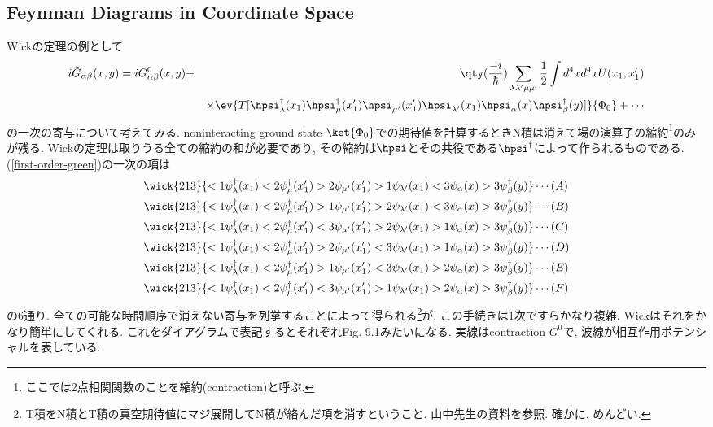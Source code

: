 \documentclass[10.5pt,a4paper]{jreport}
\begin{document}
\subsection{Feynman Diagrams in Coordinate Space}
Wickの定理の例として
\begin{eqnarray}
  \nonumber  i\tilde{G}_{\alpha\beta}(x, y) = iG^0_{\alpha\beta}(x, y) &+& \qty(\frac{-i}{\hbar})\sum_{\lambda\lambda'\mu\mu'}\frac{1}{2}\int d^4xd^4x U(x_1, x_1')\\
  &&\times \ev{T[\hpsi_{\lambda}^\dagger(x_1)\hpsi^\dagger_{\mu}(x_1')\hpsi_{\mu'}(x_1')\hpsi_{\lambda'}(x_1)\hpsi_{\alpha}(x)\hpsi^\dagger_{\beta}(y)]}{\Phi_0} + \cdots\label{first-order-green}
\end{eqnarray}
の一次の寄与について考えてみる. noninteracting ground state $\ket{\Phi_0}$での期待値を計算するときN積は消えて場の演算子の縮約\footnote{ここでは2点相関関数のことを縮約(contraction)と呼ぶ. }のみが残る. Wickの定理は取りうる全ての縮約の和が必要であり, その縮約は$\hpsi$とその共役である$\hpsi^\dagger$によって作られるものである. (\ref{first-order-green})の一次の項は
\begin{eqnarray}
  \wick{213}{<1\psi_{\lambda}^\dagger(x_1) <2\psi^\dagger_{\mu}(x_1') >2\psi_{\mu'}(x_1') >1\psi_{\lambda'}(x_1) <3\psi_{\alpha}(x) >3\psi^\dagger_{\beta}(y)} & \cdots(A)\\
  \wick{213}{<1\psi_{\lambda}^\dagger(x_1) <2\psi^\dagger_{\mu}(x_1') >1\psi_{\mu'}(x_1') >2\psi_{\lambda'}(x_1) <3\psi_{\alpha}(x) >3\psi^\dagger_{\beta}(y)} & \cdots(B)\\
  \wick{213}{<1\psi_{\lambda}^\dagger(x_1) <2\psi^\dagger_{\mu}(x_1') <3\psi_{\mu'}(x_1') >2\psi_{\lambda'}(x_1) >1\psi_{\alpha}(x) >3\psi^\dagger_{\beta}(y)} & \cdots(C)\\
  \wick{213}{<1\psi_{\lambda}^\dagger(x_1) <2\psi^\dagger_{\mu}(x_1') >2\psi_{\mu'}(x_1') <3\psi_{\lambda'}(x_1) >1\psi_{\alpha}(x) >3\psi^\dagger_{\beta}(y)} & \cdots(D)\\
  \wick{213}{<1\psi_{\lambda}^\dagger(x_1) <2\psi^\dagger_{\mu}(x_1') >1\psi_{\mu'}(x_1') <3\psi_{\lambda'}(x_1) >2\psi_{\alpha}(x) >3\psi^\dagger_{\beta}(y)} & \cdots(E)\\
  \wick{213}{<1\psi_{\lambda}^\dagger(x_1) <2\psi^\dagger_{\mu}(x_1') <3\psi_{\mu'}(x_1') >1\psi_{\lambda'}(x_1) >2\psi_{\alpha}(x) >3\psi^\dagger_{\beta}(y)} & \cdots(F)
\end{eqnarray}
の6通り. 全ての可能な時間順序で消えない寄与を列挙することによって得られる\footnote{T積をN積とT積の真空期待値にマジ展開してN積が絡んだ項を消すということ. 山中先生の資料を参照. 確かに, めんどい. }が, この手続きは1次ですらかなり複雑. Wickはそれをかなり簡単にしてくれる. これをダイアグラムで表記するとそれぞれFig. 9.1みたいになる. 実線はcontraction $G^0$で, 波線が相互作用ポテンシャルを表している.
\end{document}

